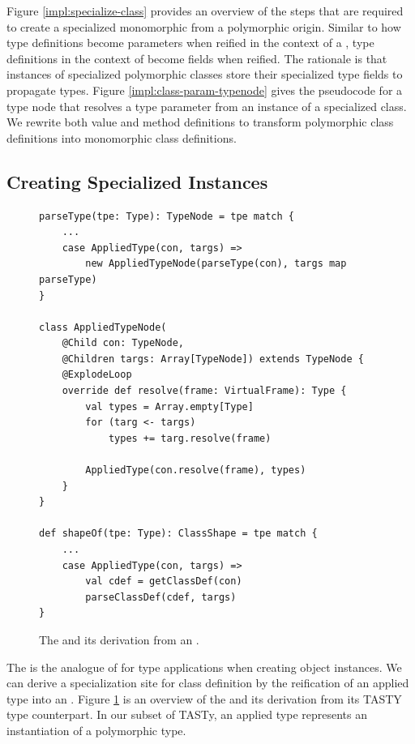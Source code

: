 Figure \ref{impl:specialize-class} provides an overview of the steps that are required to create a specialized monomorphic  from a polymorphic origin.
Similar to how type definitions become parameters when reified in the context of a , type definitions in the context of  become fields when reified.
The rationale is that instances of specialized polymorphic classes store their specialized type fields to propagate types.
Figure \ref{impl:class-param-typenode} gives the pseudocode for a type node that resolves a type parameter from an instance of a specialized class.
We rewrite both value and method definitions to transform polymorphic class definitions into monomorphic class definitions.

\subsection{Creating Specialized Instances}

\begin{figure}[!htb]
\begin{verbatim}
parseType(tpe: Type): TypeNode = tpe match {
	...
	case AppliedType(con, targs) => 
		new AppliedTypeNode(parseType(con), targs map parseType) 
}

class AppliedTypeNode(	
	@Child con: TypeNode, 
	@Children targs: Array[TypeNode]) extends TypeNode {
	@ExplodeLoop
	override def resolve(frame: VirtualFrame): Type {
		val types = Array.empty[Type]
		for (targ <- targs)
			types += targ.resolve(frame)
		
		AppliedType(con.resolve(frame), types)
	}
}

def shapeOf(tpe: Type): ClassShape = tpe match {
	...
	case AppliedType(con, targs) => 
		val cdef = getClassDef(con)
		parseClassDef(cdef, targs)
}
\end{verbatim}
\caption{The  and its derivation from an .}
\label{impl:applied-type-node}
\end{figure}

The  is the analogue of  for type applications when creating object instances.
We can derive a specialization site for class definition by the reification of an applied type into an .
Figure \ref{impl:applied-type-node} is an overview of the  and its derivation from its TASTY type counterpart.
In our subset of TASTy, an applied type represents an instantiation of a polymorphic type.

